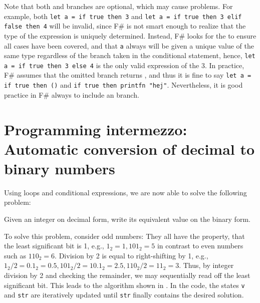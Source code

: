Note that both  and  branches are optional, which may cause problems. For example, both \mbox{\lstinline!let a = if true then 3!} and \mbox{\lstinline!let a = if true then 3 elif false then 4!}  will be invalid, since F\# is not smart enough to realize that the type of the expression is uniquely determined. Instead, F\# looks for the  to ensure all cases have been covered, and that \lstinline!a! always will be given a unique value of the same type regardless of the branch taken in the conditional statement, hence, \mbox{\lstinline!let a = if true then 3 else 4!}  is the only valid expression of the 3. In practice, F\# assumes that the omitted branch returns \lexeme{()}, and thus it is fine to say \mbox{\lstinline!let a = if true then ()!} and \mbox{\lstinline!if true then printfn "hej"!}. Nevertheless, it is good practice in F\# always to include an  branch.

\section{Programming intermezzo: Automatic conversion of decimal to binary numbers}
Using loops and conditional expressions, we are now able to solve the following problem:
\begin{problem}
  Given an integer on decimal form, write its equivalent value on the binary form.
\end{problem}
To solve this problem, consider odd numbers: They all have the property, that the least significant bit is 1, e.g., $1_2 = 1, 101_2 = 5$ in contrast to even numbers such as $110_2 = 6$. Division by 2 is equal to right-shifting by 1, e.g., $1_2/2 = 0.1_2 = 0.5, 101_2/2 = 10.1_2 = 2.5, 110_2/2 = 11_2 = 3$. Thus, by integer division by 2 and checking the remainder, we may sequentially read off the least significant bit. This leads to the algorithm shown in .
%
%
In the code, the states \lstinline!v! and \lstinline!str! are iteratively updated until \lstinline!str! finally contains the desired solution.

